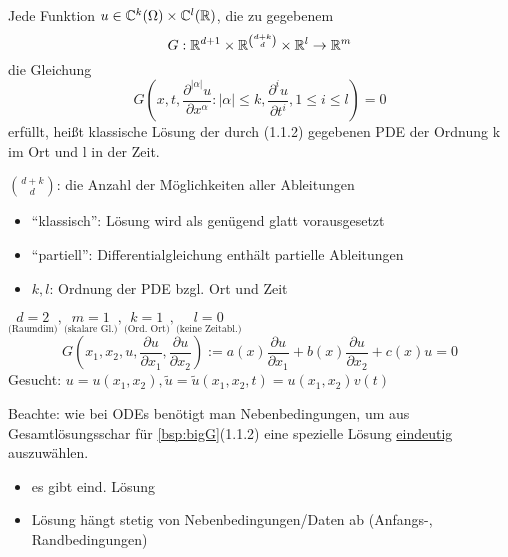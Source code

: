 \begin{definition}%
    Jede Funktion $u\in\mathbb{C}^k(\Omega)\times\mathbb{C}^l(\mathbb{R})$, die zu gegebenem 
    \[
        G: \mathbb{R}^{d+1}\times \mathbb{R}^{d+k \choose d}\times\mathbb{R}^l \to \mathbb{R}^m
    \]
     die Gleichung 
     \begin{equation}%
         G\left(x,t, \frac{\partial^{|\alpha|}u}{\partial x^\alpha}: |\alpha| \leq k, \frac{\partial^i u}{\partial t^i}, 1\leq i\leq l\right) = 0
         \label{eq:bigG}
     \end{equation}
     erfüllt, heißt klassische Lösung der durch (1.1.2) gegebenen PDE der Ordnung k im Ort und l in der Zeit.
\end{definition}

$d+k \choose d$: die Anzahl der Möglichkeiten aller Ableitungen

\begin{itemize}
    \item ``klassisch'': Lösung wird als genügend glatt vorausgesetzt
    \item ``partiell'': Differentialgleichung enthält partielle Ableitungen
    \item $k,l$: Ordnung der PDE bzgl. Ort und Zeit
\end{itemize}

\begin{beispiel}
    $\underset{\text{(Raumdim)}}{d=2}, \underset{\text{(skalare Gl.)}}{m=1}, \underset{\text{(Ord. Ort)}}{k=1}, \underset{\text{(keine Zeitabl.)}}{l=0}$
    \[
        G\left( x_1,x_2,u,\frac{\partial u}{\partial x_1}, \frac{\partial u}{\partial x_2} \right) := a(x) \frac{\partial u}{\partial x_1} + b(x) \frac{ \partial u}{\partial x_2} + c(x) u = 0
    \]
    Gesucht: $u=u(x_1,x_2), \tilde u = \tilde u(x_1,x_2,t) = u(x_1,x_2)v(t)$
    \label{bsp:bigG}
\end{beispiel}

Beachte: wie bei ODEs benötigt man Nebenbedingungen, um aus Gesamtlösungsschar für \ref{bsp:bigG}(1.1.2) eine spezielle Lösung \underline{eindeutig} auszuwählen.

\begin{definition}
\begin{itemize}
    \item es gibt eind. Lösung
    \item Lösung hängt stetig von Nebenbedingungen/Daten ab (Anfangs-, Randbedingungen)
\end{itemize}
\end{definition}

